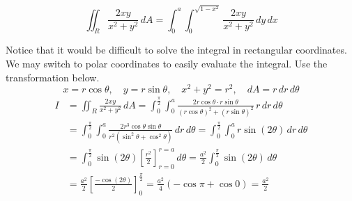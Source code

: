 \documentclass[a4paper, 12pt]{article}
\begin{document}
\begin{enumerate}[leftmargin=*,label=\textbf{\arabic*.}]
\begin{enumerate}[leftmargin=*,label=\textbf{\alph*.}]
\begin{center}
\begin{minipage}{0.35\textwidth}
\end{minipage}\begin{minipage}{0.5\textwidth}
\[\iint_R\frac{2xy}{x^2+y^2}\,dA=\int_0^a\int_0^{\sqrt{1-x^2}}\frac{2xy}{x^2+y^2}\,dy\,dx\]
\end{minipage}
\end{center}

Notice that it would be difficult to solve the integral in rectangular coordinates. We may switch to polar coordinates to easily evaluate the integral. Use the transformation below.
\[x=r\cos\theta,\quad y=r\sin\theta,\quad x^2+y^2=r^2,\quad dA=r\,dr\,d\theta\]
\begin{align*}{I}&=\iint_R\frac{2xy}{x^2+y^2}\,dA=\int_0^{\textstyle\frac\pi2}\int_0^a\frac{2r\cos\theta\cdot r\sin\theta}{\left(r\cos\theta\right)^2+\left(r\sin\theta\right)^2}\,r\,dr\,d\theta\\[1em]&=\int_0^{\textstyle\frac\pi2}\int_0^a\frac{2r^3\cos\theta\sin\theta}{r^2(\sin^2\theta+\cos^2\theta)}\,dr\,d\theta=\int_0^{\textstyle\frac\pi2}\int_0^a r \sin(2\theta)\,dr\,d\theta\\[1em]&=\int_0^{\textstyle\frac\pi2}\sin(2\theta)\left[\frac{r^2}2\right]_{r=0}^{r=a}\,d\theta=\frac{a^2}2\int_0^{\textstyle\frac\pi2}\sin(2\theta)\,d\theta\\[1em]&=\frac{a^2}2\left[\frac{-\cos(2\theta)}2\right]_0^{\textstyle\frac\pi2}=\frac{a^2}4\left(-\cos\pi+\cos0\right)=\boxed{\frac{a^2}2}\end{align*}

\end{enumerate}


\end{enumerate}
\end{document}
